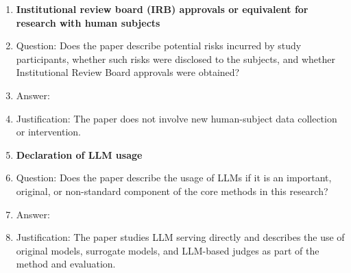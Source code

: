 \begin{enumerate}
\item {\bf Institutional review board (IRB) approvals or equivalent for research with human subjects}
    \item[] Question: Does the paper describe potential risks incurred by study participants, whether such risks were disclosed to the subjects, and whether Institutional Review Board approvals were obtained?
    \item[] Answer: \answerNA{}
    \item[] Justification: The paper does not involve new human-subject data collection or intervention.

\item {\bf Declaration of LLM usage}
    \item[] Question: Does the paper describe the usage of LLMs if it is an important, original, or non-standard component of the core methods in this research?
    \item[] Answer: \answerYes{}
    \item[] Justification: The paper studies LLM serving directly and describes the use of original models, surrogate models, and LLM-based judges as part of the method and evaluation.

\end{enumerate}